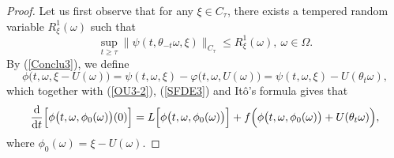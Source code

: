 \documentclass[preprint,12pt]{elsarticle}
\begin{document}
\begin{proof}
Let us first observe that for any $\xi\in C_\tau$, there exists a tempered random variable $R_\xi^1(\omega)$ such that
\begin{equation}\label{eq25}
\sup_{t\geq\tau}\|\psi(t,\theta_{-t}\omega,\xi)\|_{C_\tau}\leq R_\xi^1(\omega),\ \omega\in\Omega.
\end{equation}
By (\ref{Conclu3}), we define
\begin{equation}\label{eq26}\phi\bigl(t,\omega,\xi-U(\omega)\bigr)=\psi(t,\omega,\xi)-\varphi\bigl(t,\omega,U(\omega)\bigr)=\psi(t,\omega,\xi)-U(\theta_{t}\omega),
\end{equation}
which together with (\ref{OU3-2}), (\ref{SFDE3}) and It\^{o}'s formula gives that
\begin{equation}\label{eq27}
\frac{\rm d}{{\rm d}t}\Bigl[\phi\bigl(t,\omega,\phi_0(\omega)\bigr)(0)\Bigr]
=L\Bigl[\phi\bigl(t,\omega,\phi_0(\omega)\bigr)\Bigr]+f\Bigl(\phi\bigl(t,\omega,\phi_0(\omega)\bigr)+U(\theta_{t}\omega)\Bigr),
\end{equation}
where $\phi_0(\omega)=\xi-U(\omega)$.


\end{proof}
\end{document}
